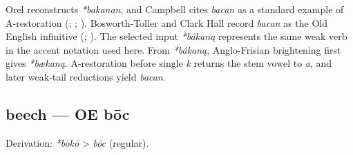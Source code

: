 \documentclass[
  british,
  a4paper,
]{article}
\begin{document}
Orel reconstructs \emph{*bakanan}, and Campbell cites \emph{bacan} as a
standard example of A-restoration (;
;
).
Bosworth-Toller and Clark Hall record \emph{bacan} as the Old English
infinitive (; ). The selected
input \emph{*bákaną} represents the same weak verb in the accent
notation used here. From \emph{*bákaną}, Anglo-Frisian brightening first
gives \emph{*bækaną}. A-restoration before single \emph{k} returns the
stem vowel to \emph{a}, and later weak-tail reductions yield
\emph{bacan}.

\subsection{beech --- OE bōc}\label{beech-oe-bux14dc}

Derivation: \emph{*bōkō} \textgreater{} \emph{bōc} (regular).

\begingroup
\setlength{\fboxsep}{6pt}
\end{document}
